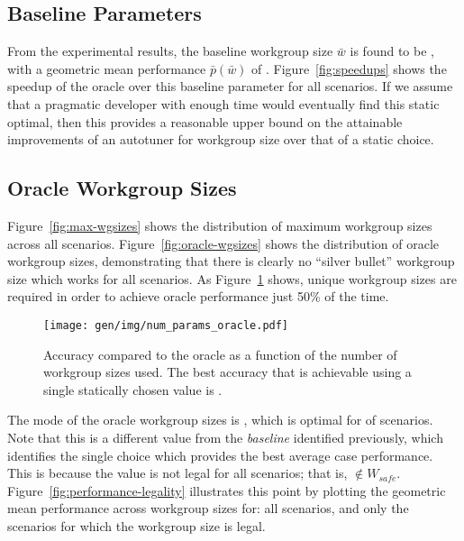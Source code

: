 

\subsection{Baseline Parameters}

From the experimental results, the baseline workgroup size $\bar{w}$
is found to be , with a geometric mean performance
$\bar{p}(\bar{w})$ of
. Figure~\ref{fig:speedups} shows the speedup of
the oracle over this baseline parameter for all scenarios. If we
assume that a pragmatic developer with enough time would eventually
find this static optimal, then this provides a reasonable upper bound
on the attainable improvements of an autotuner for workgroup size over
that of a static choice.


\subsection{Oracle Workgroup Sizes}

Figure~\ref{fig:max-wgsizes} shows the distribution of maximum
workgroup sizes across all scenarios. Figure~\ref{fig:oracle-wgsizes}
shows the distribution of oracle workgroup sizes, demonstrating that
there is clearly no ``silver bullet'' workgroup size which works for
all scenarios. As Figure~\ref{fig:oracle-accuracy} shows,
 unique workgroup sizes are
required in order to achieve oracle performance just 50\% of the
time.

\begin{figure}
\centering
\texttt{[image: gen/img/num\_params\_oracle.pdf]}
\caption{%
  Accuracy compared to the oracle as a function of the number of
  workgroup sizes used. The best accuracy that is achievable using a
  single statically chosen value is
  \protect.%
}
\label{fig:oracle-accuracy}
\end{figure}

The mode of the oracle workgroup sizes is
, which is optimal for
 of scenarios. Note that this is
a different value from the \emph{baseline} identified previously,
which identifies the single choice which provides the best average
case performance. This is because the value is not legal for all
scenarios; that is, $ \not\in W_{safe}$.
Figure~\ref{fig:performance-legality} illustrates this point by
plotting the geometric mean performance across workgroup sizes for:
all scenarios, and only the scenarios for which the workgroup size is
legal.

